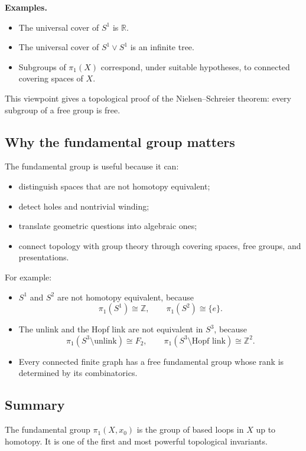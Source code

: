 \documentclass[12pt,a4paper]{article}
\theoremstyle{notespace}
\begin{document}
\textbf{Examples.}
\begin{itemize}
	\item The universal cover of \(S^1\) is \(\mathbb R\).
	\item The universal cover of \(S^1\vee S^1\) is an infinite tree.
	\item Subgroups of \(\pi_1(X)\) correspond, under suitable hypotheses, to connected covering spaces of \(X\).
\end{itemize}

This viewpoint gives a topological proof of the Nielsen--Schreier theorem: every subgroup of a free group is free.

\subsection{Why the fundamental group matters}

The fundamental group is useful because it can:
\begin{itemize}
	\item distinguish spaces that are not homotopy equivalent;
	\item detect holes and nontrivial winding;
	\item translate geometric questions into algebraic ones;
	\item connect topology with group theory through covering spaces, free groups, and presentations.
\end{itemize}

For example:
\begin{itemize}
	\item \(S^1\) and \(S^2\) are not homotopy equivalent, because
	\[
	\pi_1(S^1)\cong \mathbb Z,
	\qquad
	\pi_1(S^2)\cong \{e\}.
	\]
	\item The unlink and the Hopf link are not equivalent in \(S^3\), because
	\[
	\pi_1(S^3\setminus \text{unlink})\cong F_2,
	\qquad
	\pi_1(S^3\setminus \text{Hopf link})\cong \mathbb Z^2.
	\]
	\item Every connected finite graph has a free fundamental group whose rank is determined by its combinatorics.
\end{itemize}

\subsection{Summary}

The fundamental group \(\pi_1(X,x_0)\) is the group of based loops in \(X\) up to homotopy. It is one of the first and most powerful topological invariants.
\end{document}
